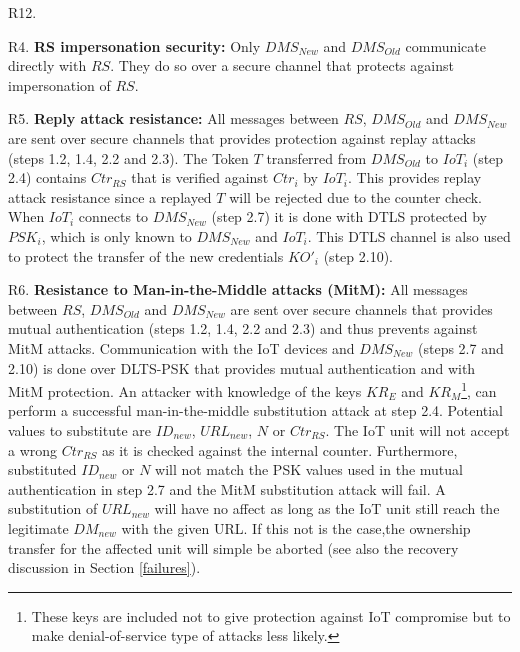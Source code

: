 {\begin{labeling}{R12.}
\item [R4.] \textbf{RS impersonation security:} %
Only $DMS_{New}$ and $DMS_{Old}$ communicate directly with $RS$. They do so over a secure channel that protects against impersonation of $RS$.
\item [R5.] \textbf{Reply attack resistance:} %
All messages between $RS$, $DMS_{Old}$ and $DMS_{New}$ are sent over secure channels that provides protection against replay attacks (steps 1.2, 1.4, 2.2 and 2.3). The Token $T$ transferred from $DMS_{Old}$ to $IoT_i$ (step 2.4) contains $Ctr_{RS}$ that is verified against $Ctr_{i}$ by $IoT_i$. This provides replay attack resistance since a replayed $T$ will be rejected due to the counter check. When $IoT_i$ connects to $DMS_{New}$ (step 2.7) it is done with DTLS protected by $PSK_i$, which is only known to $DMS_{New}$ and $IoT_i$. This DTLS channel is also used to protect the transfer of the new credentials $KO'_i$ (step 2.10).
\item [R6.] \textbf{Resistance to Man-in-the-Middle attacks (MitM):} %
All messages between $RS$, $DMS_{Old}$ and $DMS_{New}$ are sent over secure channels that provides mutual authentication (steps 1.2, 1.4, 2.2 and 2.3) and thus prevents against MitM attacks. Communication with the IoT devices and $DMS_{New}$ (steps 2.7 and 2.10) is done over DLTS-PSK that provides mutual authentication and with MitM protection. An attacker with knowledge of the keys $KR_E$ and $KR_M$\footnote{These keys are included not to give protection against IoT compromise but to make denial-of-service type of attacks less likely.}, can perform a successful man-in-the-middle substitution attack at step 2.4. Potential values to substitute are $ID_{new}$, $URL_{new}$, $N$ or $Ctr_{RS}$. The IoT unit will not accept a wrong $Ctr_{RS}$ as it is checked against the internal counter. Furthermore, substituted $ID_{new}$ or $N$ will not match the PSK values used in the mutual authentication in step 2.7 and the MitM substitution attack will fail. A substitution of $URL_{new}$ will have no affect as long as the IoT unit still reach the legitimate $DM_{new}$ with the given URL. If this not is the case,the ownership transfer for the affected unit will simple be aborted (see also the recovery discussion in Section \ref{failures}).


\end{labeling}}
